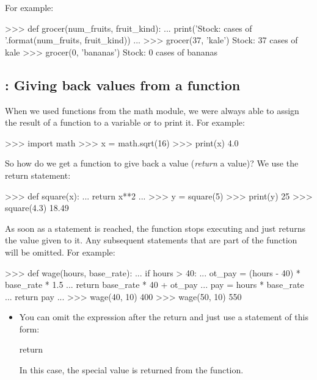 \documentclass[11pt]{cselabheader}
\begin{document}
{For example:

\begin{pyconcode}
>>> def grocer(num_fruits, fruit_kind):
...     print('Stock: {} cases of {}'.format(num_fruits, fruit_kind))
...
>>> grocer(37, 'kale')
Stock: 37 cases of kale
>>> grocer(0, 'bananas')
Stock: 0 cases of bananas
\end{pyconcode}

\subsection{\protect{}: Giving back values from a function}

When we used functions from the math module, we were always able to assign the
result of a function to a variable or to print it. For example:

\begin{pyconcode}
>>> import math
>>> x = math.sqrt(16)
>>> print(x)
4.0
\end{pyconcode}

So how do we get a function to give back a value (\emph{return} a value)? We use
the return statement:

\begin{pyconcode}
>>> def square(x):
...     return x**2
...
>>> y = square(5)
>>> print(y)
25
>>> square(4.3)
18.49
\end{pyconcode}

As soon as a  statement is reached, the function stops
executing and just returns the value given to it. Any subsequent statements that
are part of the function will be omitted. For example:

\begin{pyconcode}
>>> def wage(hours, base_rate):
...     if hours > 40:
...         ot_pay = (hours - 40) * base_rate * 1.5
...         return base_rate * 40 + ot_pay
...     pay = hours * base_rate
...     return pay
...
>>> wage(40, 10)
400
>>> wage(50, 10)
550
\end{pyconcode}

\begin{itemize}
  \item You can omit the expression after the return and just use a statement of
    this form:

    \begin{python3code}
return
    \end{python3code}

    In this case, the special value  is returned from the
    function.


\end{itemize}}
\end{document}
